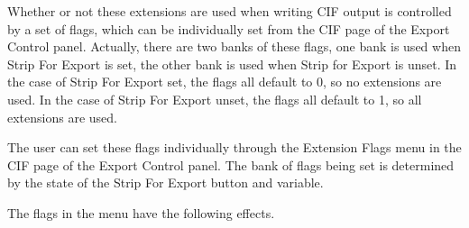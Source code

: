Whether or not these extensions are used when writing CIF output is
controlled by a set of flags, which can be individually set from the
{\cb CIF} page of the {\cb Export Control} panel.  Actually, there are
two banks of these flags, one bank is used when {\cb Strip For Export}
is set, the other bank is used when {\cb Strip for Export} is unset. 
In the case of {\cb Strip For Export} set, the flags all default to 0,
so no extensions are used.  In the case of {\cb Strip For Export}
unset, the flags all default to 1, so all extensions are used.

The user can set these flags individually through the {\cb Extension
Flags} menu in the {\cb CIF} page of the {\cb Export Control} panel. 
The bank of flags being set is determined by the state of the {\cb
Strip For Export} button and variable.

The flags in the menu have the following effects.

